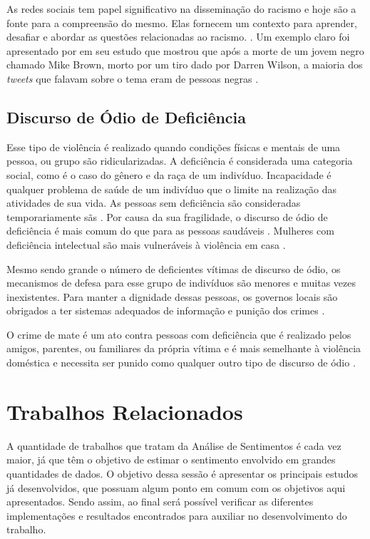 As redes sociais tem papel significativo na disseminação do racismo e hoje são a fonte para a compreensão do mesmo. Elas fornecem um contexto para aprender, desafiar e abordar as questões relacionadas ao racismo.  \cite{Chetty2018}. Um exemplo claro foi apresentado por  em seu estudo que mostrou que após a morte de um jovem negro  chamado Mike Brown, morto por um tiro dado por Darren Wilson, a maioria dos \textit{tweets} que falavam sobre o tema eram de pessoas negras \cite{Chaudhry2016}.

\subsection{Discurso de Ódio de Deficiência}

Esse tipo de violência é realizado quando condições físicas e mentais de uma pessoa, ou grupo são ridicularizadas. A deficiência é considerada uma categoria social, como é o caso do gênero e da raça de um indivíduo. Incapacidade é qualquer problema de saúde de um indivíduo que o limite na realização das atividades de sua vida. As pessoas sem deficiência são consideradas temporariamente sãs \cite{doi:10.1086/ahr/108.3.763}. Por causa da sua fragilidade, o discurso de ódio de deficiência é mais comum do que para as pessoas saudáveis \cite{Chetty2018}. Mulheres com deficiência intelectual são mais vulneráveis à violência em casa \cite{McCarthy2017}. 

Mesmo sendo grande o número de deficientes vítimas de discurso de ódio, os mecanismos de defesa para esse grupo de indivíduos são menores e muitas vezes inexistentes. Para manter a dignidade dessas pessoas, os governos locais são obrigados a ter sistemas adequados de informação e punição dos crimes \cite{Macdonald2017}.

O crime de mate é um ato contra pessoas com deficiência que é realizado pelos amigos, parentes, ou familiares da própria vítima e é mais semelhante à violência doméstica e necessita ser punido como qualquer outro tipo de discurso de ódio \cite{Chetty2018}. 

\section{Trabalhos Relacionados}
A quantidade de trabalhos que tratam da Análise de Sentimentos é cada vez maior, já que têm o objetivo de estimar o sentimento envolvido em grandes quantidades de dados. O objetivo dessa sessão é apresentar os principais estudos já desenvolvidos, que possuam algum ponto em comum com os objetivos aqui apresentados. Sendo assim, ao final será possível verificar as diferentes implementações e resultados encontrados para auxiliar no desenvolvimento do trabalho.

